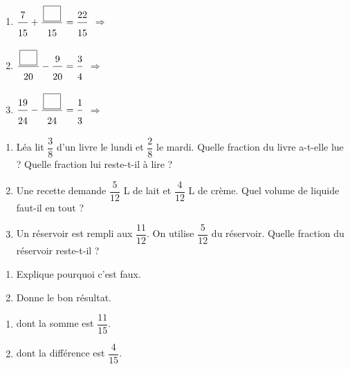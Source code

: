 \bigskip
{}
 
\begin{enumerate}[leftmargin=*,align=parleft, label=\alph*), itemsep=9pt]
\item $\FA{7}{15}+\FA{\CaseC}{15}=\FA{22}{15}$ \quad $\Longrightarrow$
\item $\FA{\CaseC}{20}-\FA{9}{20}=\FA{3}{4}$ \quad $\Longrightarrow$
\item $\FA{19}{24}-\FA{\CaseC}{24}=\FA{1}{3}$ \quad $\Longrightarrow$
\end{enumerate}
 
\bigskip
{}
 
\begin{enumerate}[leftmargin=*,align=parleft, label=\alph*), itemsep=9pt]
\item Léa lit $\dfrac{3}{8}$ d'un livre le lundi et $\dfrac{2}{8}$ le mardi. Quelle fraction du livre a-t-elle lue ? Quelle fraction lui reste-t-il à lire ?
\item Une recette demande $\dfrac{5}{12}$ L de lait et $\dfrac{4}{12}$ L de crème. Quel volume de liquide faut-il en tout ?
\item Un réservoir est rempli aux $\dfrac{11}{12}$. On utilise $\dfrac{5}{12}$ du réservoir. Quelle fraction du réservoir reste-t-il ?
\end{enumerate}
 
\bigskip
{}
 
\begin{enumerate}[leftmargin=*,align=parleft, label=\alph*), itemsep=9pt]
\item Explique pourquoi c'est faux.
\item Donne le bon résultat.
\end{enumerate}
 
\bigskip
{}
 
\begin{enumerate}[leftmargin=*,align=parleft, label=\alph*), itemsep=9pt]
\item dont la somme est $\dfrac{11}{15}$.
\item dont la différence est $\dfrac{4}{15}$.
\end{enumerate}
 
\bigskip
{}
 
